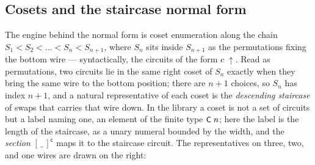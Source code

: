 \subsection{Cosets and the staircase normal form}\label{sec:sn-cosets}

The engine behind the normal form is coset enumeration along the chain
$S_1 < S_2 < \dots < S_n < S_{n+1}$, where $S_n$ sits inside $S_{n+1}$ as
the permutations fixing the bottom wire --- syntactically, the circuits
of the form $c\;{\uparrow}$.  Read as permutations, two circuits lie in the
same right coset of $S_n$ exactly when they bring the same wire to the
bottom position; there are $n{+}1$ choices, so $S_n$ has index $n{+}1$,
and a natural representative of each coset is the \emph{descending
staircase} of swaps that carries that wire down.  In the library a coset
is not a set of circuits but a label naming one, an element of the finite type
$\mbox{\textsf{\small C}}\;n$; here the label is the length of the staircase, as a unary
numeral bounded by the width, and the \emph{section} $[\,\_\,]^{\mathsf
c}$ maps it to the staircase circuit.  The representatives on three,
two, and one wires are drawn on the right:

